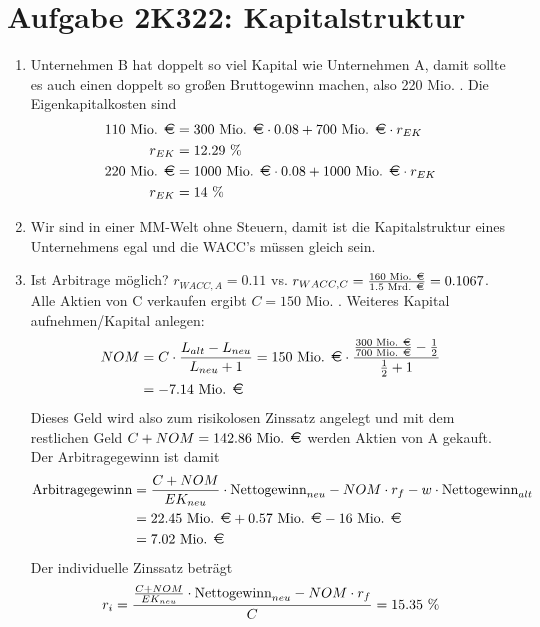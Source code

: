 \documentclass{article}
\begin{document}
	\section*{Aufgabe 2K322: Kapitalstruktur}
	\begin{enumerate}[label=(\alph*)]
		\item Unternehmen B hat doppelt so viel Kapital wie Unternehmen A, damit sollte es auch einen doppelt so großen Bruttogewinn machen, also 220 Mio. \EUR. Die Eigenkapitalkosten sind
		\begin{align}
			110\text{ Mio. \EUR} &= 300 \text{ Mio. \EUR}\cdot 0.08 + 700\text{ Mio. \EUR}\cdot r_{EK} \notag \\
			r_{EK} &= 12.29\text{ \%}\notag \\
			220\text{ Mio. \EUR} &= 1000 \text{ Mio. \EUR}\cdot 0.08 + 1000\text{ Mio. \EUR}\cdot r_{EK} \notag \\
			r_{EK} &= 14\text{ \%}\notag
		\end{align}
		\item Wir sind in einer MM-Welt ohne Steuern, damit ist die Kapitalstruktur eines Unternehmens egal und die WACC's müssen gleich sein.
		\item Ist Arbitrage möglich? $r_{WACC,A}=0.11$ vs. $r_{WACC,C}=\frac{160\text{ Mio. \EUR}}{1.5\text{ Mrd. \EUR}}=0.1067$. Alle Aktien von C verkaufen ergibt $C=150$ Mio. \EUR. Weiteres Kapital aufnehmen/Kapital anlegen:
		\begin{align}
			NOM &= C\cdot\frac{L_{alt}-L_{neu}}{L_{neu}+1} = 150\text{ Mio. \EUR}\cdot\frac{\frac{300\text{ Mio. \EUR}}{700\text{ Mio. \EUR}}-\frac{1}{2}}{\frac{1}{2}+1}\notag \\
			&= -7.14\text{ Mio. \EUR} \notag
		\end{align}
		Dieses Geld wird also zum risikolosen Zinssatz angelegt und mit dem restlichen Geld $C+NOM=142.86\text{ Mio. \EUR}$ werden Aktien von A gekauft. Der Arbitragegewinn ist damit
		\begin{align}
			\text{Arbitragegewinn} &= \frac{C+NOM}{EK_{neu}}\cdot\text{Nettogewinn}_{neu} - NOM\cdot r_f - w\cdot\text{Nettogewinn}_{alt} \notag \\
			&= 22.45\text{ Mio. \EUR} + 0.57\text{ Mio. \EUR} - 16\text{ Mio. \EUR} \notag \\
			&= 7.02\text{ Mio. \EUR} \notag
		\end{align}
		Der individuelle Zinssatz beträgt
		\begin{align}
			r_i = \frac{\frac{C+NOM}{EK_{neu}}\cdot\text{Nettogewinn}_{neu} - NOM\cdot r_f}{C} = 15.35\text{ \%} \notag

\end{align}
\end{enumerate}
\end{document}
